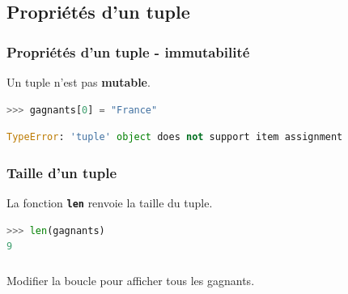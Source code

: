 \documentclass[svgnames,11pt]{beamer}
\begin{document}
\subsection{Propriétés d'un tuple}
\begin{frame}[fragile]
    \frametitle{Propriétés d'un tuple - immutabilité}

    \begin{aretenir}[]
    Un tuple n'est pas \textbf{mutable}.
    \end{aretenir}
\begin{center}
\begin{lstlisting}[language=Python , basicstyle=\ttfamily\small, xleftmargin=2em, xrightmargin=2em]
>>> gagnants[0] = "France"
\end{lstlisting}
\label{CODE}
\end{center}
\begin{center}
\begin{lstlisting}[language=Python , basicstyle=\ttfamily\small, xleftmargin=2em, xrightmargin=2em]
TypeError: 'tuple' object does not support item assignment
\end{lstlisting}
\label{CODE}
\end{center}
\end{frame}
\begin{frame}[fragile]
    \frametitle{Taille d'un tuple}

\begin{aretenir}[]
La fonction \textbf{\texttt{len}} renvoie la taille du tuple.
\end{aretenir}
\begin{center}
\begin{lstlisting}[language=Python , basicstyle=\ttfamily\small, xleftmargin=2em, xrightmargin=2em]
>>> len(gagnants)
9
\end{lstlisting}
\label{CODE}
\end{center}
\end{frame}
\begin{frame}
    \frametitle{}

    \begin{activite}
    Modifier la boucle pour afficher tous les gagnants.
    \end{activite}

\end{frame}
\end{document}
